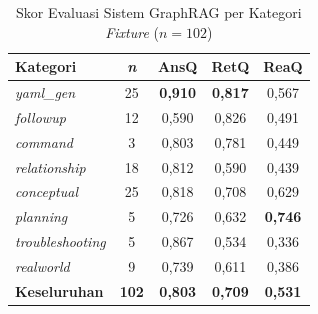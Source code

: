 \renewcommand{\arraystretch}{1.3}
\captionsetup[table]{justification=raggedright,singlelinecheck=false}
\begin{table}[H]
\caption{Skor Evaluasi Sistem GraphRAG per Kategori \textit{Fixture} ($n{=}102$)}
\label{tbl:category_scores}
\centering
\begin{tabular}{| p{} | c | c | c | c |}
\hline
\textbf{Kategori} & \textbf{\textit{n}} & \textbf{AnsQ} & \textbf{RetQ} & \textbf{ReaQ} \\
\hline
\textit{yaml\_gen}       & 25 & \textbf{0,910} & \textbf{0,817} & 0,567 \\
\hline
\textit{followup}        & 12 & 0,590 & 0,826 & 0,491 \\
\hline
\textit{command}         &  3 & 0,803 & 0,781 & 0,449 \\
\hline
\textit{relationship}    & 18 & 0,812 & 0,590 & 0,439 \\
\hline
\textit{conceptual}      & 25 & 0,818 & 0,708 & 0,629 \\
\hline
\textit{planning}        &  5 & 0,726 & 0,632 & \textbf{0,746} \\
\hline
\textit{troubleshooting} &  5 & 0,867 & 0,534 & 0,336 \\
\hline
\textit{realworld}       &  9 & 0,739 & 0,611 & 0,386 \\
\hline
\textbf{Keseluruhan}     & \textbf{102} & \textbf{0,803} & \textbf{0,709} & \textbf{0,531} \\
\hline
\end{tabular}
\end{table}